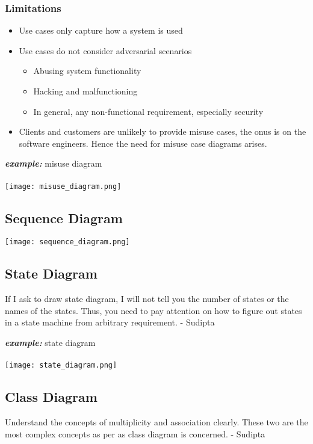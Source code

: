 \documentclass[a4paper]{article}
\begin{document}
\subsubsection{Limitations}
\begin{itemize}
	\item Use cases only capture how a system is used
	\item Use cases do not consider adversarial scenarios
	\begin{itemize}[label=$\circ$]
		\item Abusing system functionality
		\item Hacking and malfunctioning
		\item In general, any non-functional requirement, especially security
	\end{itemize}
	\item Clients and customers are unlikely to provide misuse cases, the onus is on the software engineers. Hence the need for misuse case diagrams arises.
\end{itemize}
\begin{center}
	\textit{\textbf{example: }}misuse diagram\\
	\mbox{}\\
	\texttt{[image: misuse\_diagram.png]}
\end{center}
\subsection{Sequence Diagram}
\begin{center}
	\texttt{[image: sequence\_diagram.png]}
\end{center}
\newpage
\subsection{State Diagram}
\begin{displayquote}
	If I ask to draw state diagram, I will not tell you the number of states or the names of the states. Thus, you need to pay attention on how to figure out states in a state machine from arbitrary requirement. - Sudipta
\end{displayquote}
\begin{center}
	\textit{\textbf{example: }}state diagram\\
	\mbox{}\\
	\texttt{[image: state\_diagram.png]}
\end{center}
\newpage
\subsection{Class Diagram}
\begin{displayquote}
	Understand the concepts of multiplicity and association clearly. These two are the most complex concepts as per as class diagram is concerned. - Sudipta
\end{displayquote}
\end{document}
